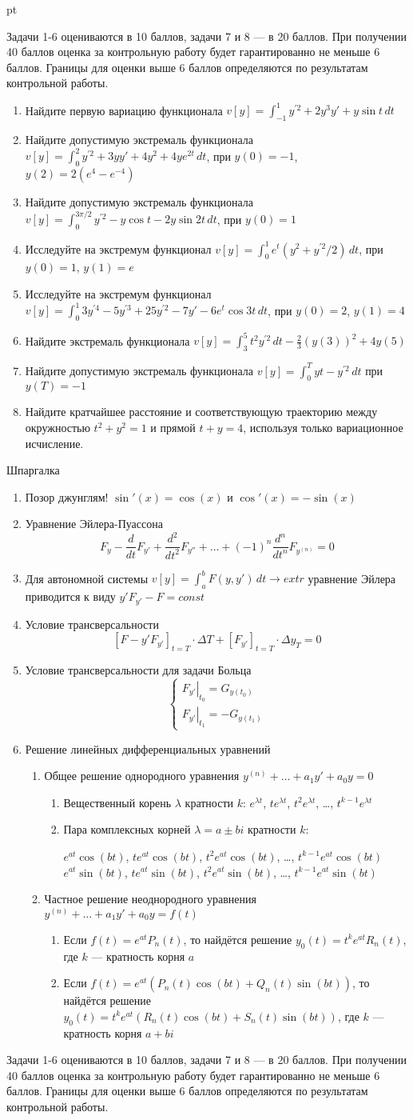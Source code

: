 \documentclass[pdftex,12pt,a4paper]{article}
\newcommand{\shpargalka}{Шпаргалка

\begin{enumerate}
\item Позор джунглям! $\sin'(x)=\cos(x)$ и $\cos'(x)=-\sin(x)$

\item Уравнение Эйлера-Пуассона
\[
F_y-\frac{d}{dt}F_{y'}+\frac{d^2}{dt^2}F_{y''}+\ldots+(-1)^n\frac{d^n}{dt^n}F_{y^{(n)}}=0
\]

\item Для автономной системы $v[y]=\int_a^b F(y,y')\, dt \to extr$ уравнение Эйлера приводится к виду $y'F_{y'}-F=const$

\item Условие трансверсальности 
\[
[F-y'F_{y'}]_{t=T}\cdot \Delta T + [F_{y'}]_{t=T}\cdot \Delta y_T=0
\]

\item Условие трансверсальности для задачи Больца
\[
\begin{cases}
\left. F_{y'}\right|_{t_0}=G_{y(t_0)} \\
\left. F_{y'}\right|_{t_1}=-G_{y(t_1)}
\end{cases}
\]

\item Решение линейных дифференциальных уравнений

\begin{enumerate}
\item Общее решение однородного уравнения $y^{(n)}+\ldots+a_1 y'+a_0 y=0$
\begin{enumerate}
\item Вещественный корень $\lambda$ кратности $k$: $e^{\lambda t}$, $te^{\lambda t}$, $t^2e^{\lambda t}$, \ldots, $t^{k-1}e^{\lambda t}$
\item Пара комплексных корней $\lambda=a\pm bi$  кратности $k$:

$e^{at}\cos(bt)$, $te^{at}\cos(bt)$, $t^2e^{at}\cos(bt)$, \ldots, $t^{k-1}e^{at}\cos(bt)$ \\
$e^{at}\sin(bt)$, $te^{at}\sin(bt)$, $t^2e^{at}\sin(bt)$, \ldots, $t^{k-1}e^{at}\sin(bt)$
\end{enumerate}
\item Частное решение неоднородного уравнения $y^{(n)}+\ldots+a_1 y'+a_0 y=f(t)$
\begin{enumerate}
\item Если $f(t)=e^{at}P_n(t)$, то найдётся решение $y_0(t)=t^k e^{at} R_n(t)$, где $k$ --- кратность корня $a$
\item Если $f(t)=e^{at}(P_n(t)\cos(bt)+Q_n(t)\sin(bt))$, то найдётся решение \\
$y_0(t)=t^k e^{at}(R_n(t)\cos(bt)+S_n(t)\sin(bt))$, где $k$ --- кратность корня $a+bi$
\end{enumerate}
\end{enumerate}

\end{enumerate}
}
\begin{document}
 pt %

Задачи 1-6 оцениваются в 10 баллов, задачи 7 и 8 --- в 20 баллов. При получении 40 баллов оценка за контрольную работу будет гарантированно не меньше 6 баллов. Границы для оценки выше 6 баллов определяются по результатам контрольной работы.

\vspace{20pt}

\begin{enumerate}
\item Найдите первую вариацию функционала $v[y]=\int_{-1}^1 y^{\prime 2} +2y^3 y'+y\sin t \, dt$
\item Найдите допустимую экстремаль функционала
$v[y]=\int_0^2 y^{\prime 2} +3yy'+4y^2+4ye^{2t} \, dt$, при $y(0)=-1$, $y(2)=2(e^4-e^{-4})$

\item Найдите допустимую экстремаль функционала
$v[y]=\int_0^{3\pi/2} y^{\prime 2} -y\cos t -2y\sin 2t \, dt$, при $y(0)=1$

\item Исследуйте на экстремум функционал $v[y]=\int_0^1 e^t \left(y^2+y^{\prime 2}/2 \right) \, dt$, при $y(0)=1$, $y(1)=e$

\item Исследуйте на экстремум функционал $v[y]=\int_0^1 3y^{\prime 4} - 5y^{\prime 3}+25y^{\prime 2}-7y'-6e^t \cos 3t \, dt$, при $y(0)=2$, $y(1)=4$

\item Найдите экстремаль функционала $v[y]=\int_3^5 t^2 y^{\prime 2} \, dt-\frac{2}{3}(y(3))^2+4y(5)$

\item Найдите допустимую экстремаль функционала $v[y]=\int_0^T yt-y^{\prime 2} \, dt$ при $y(T)=-1$

\item Найдите кратчайшее расстояние и соответствующую траекторию между окружностью $t^2+y^2=1$ и прямой $t+y=4$, используя только вариационное исчисление.

\end{enumerate}

\vspace{40pt}

\shpargalka

\newpage
Задачи 1-6 оцениваются в 10 баллов, задачи 7 и 8 --- в 20 баллов. При получении 40 баллов оценка за контрольную работу будет гарантированно не меньше 6 баллов. Границы для оценки выше 6 баллов определяются по результатам контрольной работы.
\end{document}
